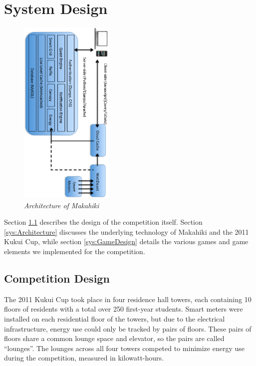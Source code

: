 \documentclass{acm_proc_article-sp}
\begin{document}
\section{System Design}
\begin{figure}[t!]
  \center
  \includegraphics[width=0.4\textwidth, angle=90]{makahiki-architecture.eps}
  \caption{\em \small Architecture of Makahiki}
  \label{fig:MakahikiArchitecture}
\end{figure}

Section \ref{sys:competition} describes the design of the competition itself. Section \ref{sys:Architecture} discusses the underlying technology of Makahiki and the 2011 Kukui Cup, while section \ref{sys:GameDesign} details the various games and game elements we implemented for the competition.

\subsection{Competition Design}
\label{sys:competition}

The 2011 Kukui Cup took place in four residence hall towers, each containing 10 floors of residents with a total over 250 first-year students. Smart meters were installed on each residential floor of the towers, but due to the electrical infrastructure, energy use could only be tracked by pairs of floors. These pairs of floors share a common lounge space and elevator, so the pairs are called ``lounges''. The lounges across all four towers competed to minimize energy use during the competition, measured in kilowatt-hours.
\end{document}
